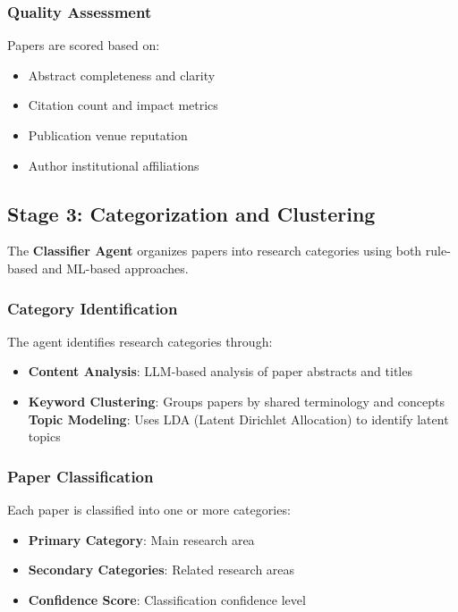 \subsubsection{Quality Assessment}

Papers are scored based on:
\begin{itemize}
    \item Abstract completeness and clarity
    \item Citation count and impact metrics
    \item Publication venue reputation
    \item Author institutional affiliations
\end{itemize}

\subsection{Stage 3: Categorization and Clustering}

The \textbf{Classifier Agent} organizes papers into research categories using both rule-based and ML-based approaches.

\subsubsection{Category Identification}

The agent identifies research categories through:
\begin{itemize}
    \item \textbf{Content Analysis}: LLM-based analysis of paper abstracts and titles
    \item \textbf{Keyword Clustering}: Groups papers by shared terminology and concepts
    \textbf{Topic Modeling}: Uses LDA (Latent Dirichlet Allocation) to identify latent topics
\end{itemize}

\subsubsection{Paper Classification}

Each paper is classified into one or more categories:
\begin{itemize}
    \item \textbf{Primary Category}: Main research area
    \item \textbf{Secondary Categories}: Related research areas
    \item \textbf{Confidence Score}: Classification confidence level
\end{itemize}

